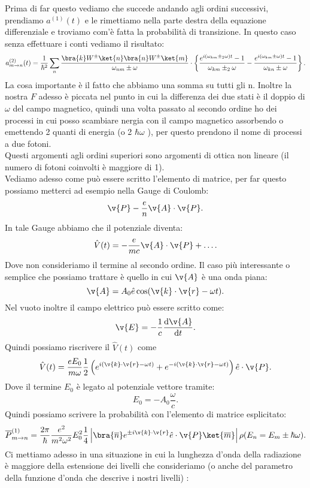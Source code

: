 Prima di far questo vediamo che succede andando agli ordini successivi, prendiamo $a^{(1)}(t) $ e le rimettiamo nella parte destra della equazione differenziale e troviamo com'è fatta la probabilità di transizione. In questo caso senza effettuare i conti vediamo il risultato:
\[
    a^{(2)}_{m\to n}(t) =
    \frac{1}{\hbar ^2} \sum_{n}^{} 
    \frac{\bra{k}W^{\pm}\ket{n} \bra{n}W^{\pm} \ket{m}}{\omega_{nm}\pm \omega}
    \cdot 
    \left\{
	\frac{e^{i(\omega_{km}\pm_2\omega)t}-1}{\omega_{km}\pm_2\omega}
    - \frac{e^{i(\omega_{km}\pm \omega)t}-1}{\omega_{kn}\pm\omega}\right\}
.\] 
La cosa importante è il fatto che abbiamo una somma su tutti gli n. Inoltre la nostra $F$ adesso è piccata nel punto in cui la differenza dei due stati è il doppio di $\omega$ del campo magnetico, quindi una volta passato al secondo ordine ho dei processi in cui posso scambiare nergia con il campo magnetico assorbendo o emettendo 2 quanti di energia (o 2 $\hbar \omega$ ), per questo prendono il nome di processi a due fotoni.\\
Questi argomenti agli ordini superiori sono argomenti di ottica non lineare (il numero di fotoni coinvolti è maggiore di 1).\\
Vediamo adesso come può essere scritto l'elemento di matrice, per far questo possiamo metterci ad esempio nella Gauge di Coulomb:
\[
\v{P}- \frac{e}{n}\v{A}\cdot \v{P}
.\] 
In tale Gauge abbiamo che il potenziale diventa:
\[
    \hat{V}(t) = -\frac{e}{mc}\v{A}\cdot \v{P} + \ldots
.\] 
Dove non consideriamo il termine al secondo ordine. Il caso più interessante o semplice che possiamo trattare è quello in cui $\v{A}$ è una onda piana:
\[
    \v{A}=A_0 \hat{e}\cos(\v{k}\cdot \v{r}-\omega t) 
.\] 
Nel vuoto inoltre il campo elettrico può essere scritto come:
\[
\v{E}= -\frac{1}{c}\frac{\text{d} \v{A}}{\text{d} t} 
.\] 
Quindi possiamo riscrivere il $\hat{V}(t) $  come 
\[
    \hat{V}(t) = \frac{eE_0}{m\omega} \frac{1}{2}\left(e^{i(\v{k}\cdot \v{r}-\omega t)} + e^{-i(\v{k}\cdot \v{r}-\omega t) }\right) \hat{e}\cdot \v{P}
.\] 
Dove il termine $E_0$  è legato al potenziale vettore tramite:
\[
E_0=-A_0 \frac{\omega}{c}
.\] 
Quindi possiamo scrivere la probabilità con l'elemento di matrice esplicitato:
\[
    \overline{P}^{(1)}_{m\to n}=
    \frac{2\pi}{\hbar }\frac{e^2}{m^2\omega^2}E_0^2 \frac{1}{4}
    \left|
    \bra{\overline{n}}
    e^{\pm i \v{k}\cdot \v{r}}\hat{e}\cdot \v{P} 
    \ket{\overline{m}}
    \right|\rho(E_n = E_m \pm \hbar \omega) 
.\] 
Ci mettiamo adesso in una situazione in cui la lunghezza d'onda della radiazione è maggiore della estensione dei livelli che consideriamo (o anche del parametro della funzione d'onda che descrive i nostri livelli) :
